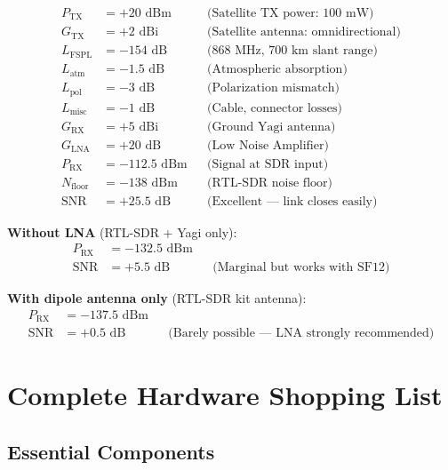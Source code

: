 \documentclass[12pt,a4paper]{article}
\begin{document}
\begin{align}
    P_{\text{TX}} &= +20 \text{~dBm} && \text{(Satellite TX power: 100~mW)} \\
    G_{\text{TX}} &= +2 \text{~dBi} && \text{(Satellite antenna: omnidirectional)} \\
    L_{\text{FSPL}} &= -154 \text{~dB} && \text{(868~MHz, 700~km slant range)} \\
    L_{\text{atm}} &= -1.5 \text{~dB} && \text{(Atmospheric absorption)} \\
    L_{\text{pol}} &= -3 \text{~dB} && \text{(Polarization mismatch)} \\
    L_{\text{misc}} &= -1 \text{~dB} && \text{(Cable, connector losses)} \\
    G_{\text{RX}} &= +5 \text{~dBi} && \text{(Ground Yagi antenna)} \\
    G_{\text{LNA}} &= +20 \text{~dB} && \text{(Low Noise Amplifier)} \\
    \hline
    P_{\text{RX}} &= -112.5 \text{~dBm} && \text{(Signal at SDR input)} \\
    N_{\text{floor}} &= -138 \text{~dBm} && \text{(RTL-SDR noise floor)} \\
    \text{SNR} &= +25.5 \text{~dB} && \text{(Excellent — link closes easily)}
\end{align}

\textbf{Without LNA} (RTL-SDR + Yagi only):
\begin{align}
    P_{\text{RX}} &= -132.5 \text{~dBm} \\
    \text{SNR} &= +5.5 \text{~dB} && \text{(Marginal but works with SF12)}
\end{align}

\textbf{With dipole antenna only} (RTL-SDR kit antenna):
\begin{align}
    P_{\text{RX}} &= -137.5 \text{~dBm} \\
    \text{SNR} &= +0.5 \text{~dB} && \text{(Barely possible — LNA strongly recommended)}
\end{align}

\section{Complete Hardware Shopping List}

\subsection{Essential Components}
\end{document}
